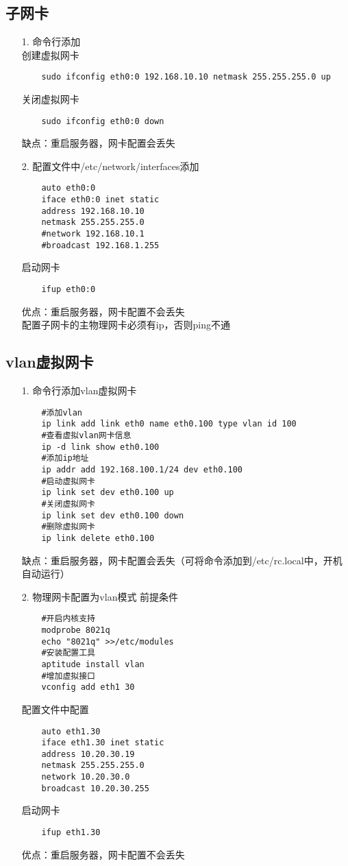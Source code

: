 \documentclass[a4paper,left=1.5cm,right=1.5cm,11pt]{article}
\begin{document}
\subsection{子网卡}
\begin{itemize}
	\item[1.]命令行添加\\
	创建虚拟网卡
	\begin{lstlisting}
	sudo ifconfig eth0:0 192.168.10.10 netmask 255.255.255.0 up
	\end{lstlisting}
	关闭虚拟网卡
	\begin{lstlisting}
	sudo ifconfig eth0:0 down
	\end{lstlisting}
	缺点：重启服务器，网卡配置会丢失
	\item[2.]配置文件中/etc/network/interfaces添加
	\begin{lstlisting}
	auto eth0:0
	iface eth0:0 inet static
	address 192.168.10.10
	netmask 255.255.255.0
	#network 192.168.10.1
	#broadcast 192.168.1.255
	\end{lstlisting}
	启动网卡
	\begin{lstlisting}
	ifup eth0:0
	\end{lstlisting}
	优点：重启服务器，网卡配置不会丢失\\
	配置子网卡的主物理网卡必须有ip，否则ping不通
\end{itemize}
\subsection{vlan虚拟网卡}
\begin{itemize}
	\item[1.]命令行添加vlan虚拟网卡\\
	\begin{lstlisting}
	#添加vlan
	ip link add link eth0 name eth0.100 type vlan id 100
	#查看虚拟vlan网卡信息
	ip -d link show eth0.100
	#添加ip地址
	ip addr add 192.168.100.1/24 dev eth0.100
	#启动虚拟网卡
	ip link set dev eth0.100 up
	#关闭虚拟网卡
	ip link set dev eth0.100 down
	#删除虚拟网卡
	ip link delete eth0.100	
	\end{lstlisting}
	缺点：重启服务器，网卡配置会丢失（可将命令添加到/etc/rc.local中，开机自动运行）
	\item[2.]物理网卡配置为vlan模式
	前提条件
	\begin{lstlisting}
	#开启内核支持
	modprobe 8021q
	echo "8021q" >>/etc/modules
	#安装配置工具
	aptitude install vlan
	#增加虚拟接口
	vconfig add eth1 30
	\end{lstlisting}
	配置文件中配置
	\begin{lstlisting}
	auto eth1.30
	iface eth1.30 inet static
    address 10.20.30.19
    netmask 255.255.255.0
    network 10.20.30.0
    broadcast 10.20.30.255
	\end{lstlisting}
	启动网卡
	\begin{lstlisting}
	ifup eth1.30
	\end{lstlisting}
	优点：重启服务器，网卡配置不会丢失
\end{itemize}
 
\end{document}
